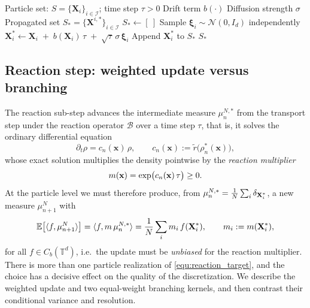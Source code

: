 \documentclass[a4paper,fleqn]{cas-sc}
\theoremstyle{definition}
\theoremstyle{remark}
\begin{document}
\begin{algorithm}
\caption{SDE propagation of the advection--diffusion step}\label{alg:sde}
\begin{algorithmic}
\Require Particle set: $S=\{\mathbf{X}_i\}_{i\in\mathcal I}$; time step $\tau>0$
\Require Drift term $b(\cdot)$
\Require Diffusion strength $\sigma$
\Ensure Propagated set $S_*=\{\mathbf{X}^{i,*}\}_{i\in\mathcal I}$
  \State $S_{*}\gets [\ ]$
    \State Sample $\boldsymbol{\xi}_i \sim \mathcal N(0,I_d)$ independently
    \State $\mathbf{X}^*_i \gets \mathbf{X}_i \;+\; b(\mathbf{X}_i)\,\tau \;+\; \sqrt{\tau}\,\sigma\,\boldsymbol{\xi}_i$
    \State Append $\mathbf{X}^{*}_i$ to $S_{*}$
  \EndFor
  \State \Return $S_{*}$
\EndProcedure
\end{algorithmic}
\end{algorithm}

\subsection{Reaction step: weighted update versus branching}
\label{sec:reaction}
The reaction sub-step advances the intermediate measure $\mu_n^{N,\ast}$ from the transport step under the
reaction operator $\mathcal B$ over a time step $\tau$, that is, it solves the ordinary
differential equation
\[
\partial_t \rho = c_n(\mathbf{x})\,\rho,
\qquad c_n(\mathbf{x}) := \tilde r\!\big(\rho_n^\ast(\mathbf{x})\big),
\]
whose exact solution multiplies the density pointwise by the \emph{reaction multiplier}
\begin{equation}\label{equ:multiplier}
m(\mathbf{x}) = \exp\!\big(c_n(\mathbf{x})\,\tau\big)\ge 0 .
\end{equation}
At the particle level we must therefore produce, from $\mu_n^{N,\ast}=\frac1N\sum_i \delta_{\mathbf{X}_i^\ast}$, a new
measure $\mu_{n+1}^N$ with
\begin{equation}\label{equ:reaction_target}
\mathbb E\big[\langle f,\mu_{n+1}^N\rangle\big]
=\langle f, m\,\mu_n^{N,\ast}\rangle
=\frac1N\sum_{i} m_i\, f(\mathbf{X}_i^\ast),
\qquad m_i := m(\mathbf{X}_i^\ast),
\end{equation}
for all $f\in C_b(\mathbb T^d)$, i.e.\ the update must be \emph{unbiased} for the reaction multiplier. There is
more than one particle realization of \eqref{equ:reaction_target}, and the choice has a decisive effect on the
quality of the discretization. We describe the weighted update and two equal-weight branching kernels, and then
contrast their conditional variance and resolution.
\end{document}
